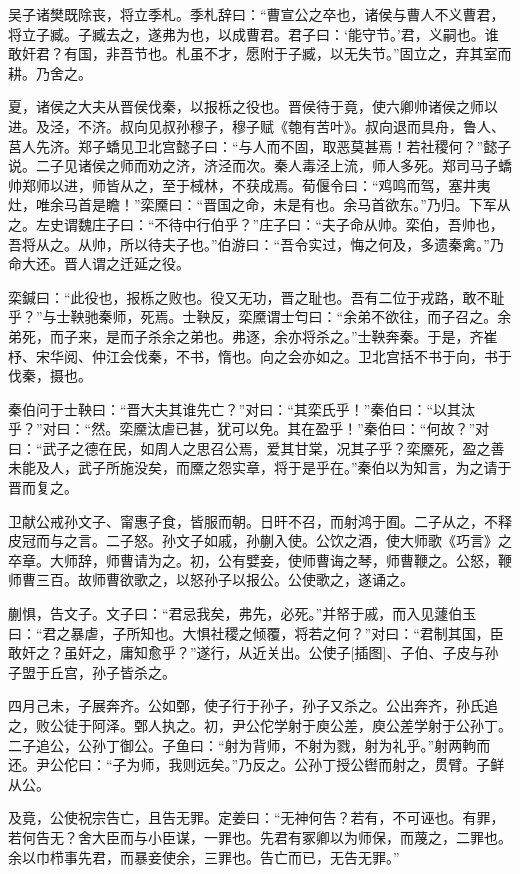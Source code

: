 \documentclass[a4paper,12pt,UTF8,twoside]{ctexbook}
\begin{document}
吴子诸樊既除丧，将立季札。季札辞曰：“曹宣公之卒也，诸侯与曹人不义曹君，将立子臧。子臧去之，遂弗为也，以成曹君。君子曰：‘能守节。’君，义嗣也。谁敢奸君？有国，非吾节也。札虽不才，愿附于子臧，以无失节。”固立之，弃其室而耕。乃舍之。

夏，诸侯之大夫从晋侯伐秦，以报栎之役也。晋侯待于竟，使六卿帅诸侯之师以进。及泾，不济。叔向见叔孙穆子，穆子赋《匏有苦叶》。叔向退而具舟，鲁人、莒人先济。郑子蟜见卫北宫懿子曰：“与人而不固，取恶莫甚焉！若社稷何？”懿子说。二子见诸侯之师而劝之济，济泾而次。秦人毒泾上流，师人多死。郑司马子蟜帅郑师以进，师皆从之，至于棫林，不获成焉。荀偃令曰：“鸡鸣而驾，塞井夷灶，唯余马首是瞻！”栾黡曰：“晋国之命，未是有也。余马首欲东。”乃归。下军从之。左史谓魏庄子曰：“不待中行伯乎？”庄子曰：“夫子命从帅。栾伯，吾帅也，吾将从之。从帅，所以待夫子也。”伯游曰：“吾令实过，悔之何及，多遗秦禽。”乃命大还。晋人谓之迁延之役。

栾鍼曰：“此役也，报栎之败也。役又无功，晋之耻也。吾有二位于戎路，敢不耻乎？”与士鞅驰秦师，死焉。士鞅反，栾黡谓士匄曰：“余弟不欲往，而子召之。余弟死，而子来，是而子杀余之弟也。弗逐，余亦将杀之。”士鞅奔秦。于是，齐崔杼、宋华阅、仲江会伐秦，不书，惰也。向之会亦如之。卫北宫括不书于向，书于伐秦，摄也。

秦伯问于士鞅曰：“晋大夫其谁先亡？”对曰：“其栾氏乎！”秦伯曰：“以其汰乎？”对曰：“然。栾黡汰虐已甚，犹可以免。其在盈乎！”秦伯曰：“何故？”对曰：“武子之德在民，如周人之思召公焉，爱其甘棠，况其子乎？栾黡死，盈之善未能及人，武子所施没矣，而黡之怨实章，将于是乎在。”秦伯以为知言，为之请于晋而复之。

卫献公戒孙文子、甯惠子食，皆服而朝。日旰不召，而射鸿于囿。二子从之，不释皮冠而与之言。二子怒。孙文子如戚，孙蒯入使。公饮之酒，使大师歌《巧言》之卒章。大师辞，师曹请为之。初，公有嬖妾，使师曹诲之琴，师曹鞭之。公怒，鞭师曹三百。故师曹欲歌之，以怒孙子以报公。公使歌之，遂诵之。

蒯惧，告文子。文子曰：“君忌我矣，弗先，必死。”并帑于戚，而入见蘧伯玉曰：“君之暴虐，子所知也。大惧社稷之倾覆，将若之何？”对曰：“君制其国，臣敢奸之？虽奸之，庸知愈乎？”遂行，从近关出。公使子[插图]、子伯、子皮与孙子盟于丘宫，孙子皆杀之。

四月己未，子展奔齐。公如鄄，使子行于孙子，孙子又杀之。公出奔齐，孙氏追之，败公徒于阿泽。鄄人执之。初，尹公佗学射于庾公差，庾公差学射于公孙丁。二子追公，公孙丁御公。子鱼曰：“射为背师，不射为戮，射为礼乎。”射两軥而还。尹公佗曰：“子为师，我则远矣。”乃反之。公孙丁授公辔而射之，贯臂。子鲜从公。

及竟，公使祝宗告亡，且告无罪。定姜曰：“无神何告？若有，不可诬也。有罪，若何告无？舍大臣而与小臣谋，一罪也。先君有冢卿以为师保，而蔑之，二罪也。余以巾栉事先君，而暴妾使余，三罪也。告亡而已，无告无罪。”
\end{document}
